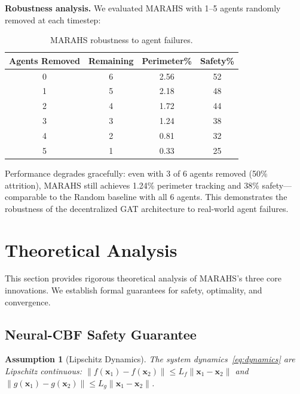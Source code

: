\documentclass[12pt,a4paper]{article}
\DeclareRobustCommand{\vect}[1]{\bm{#1}}
\newtheorem{assumption}[theorem]{Assumption}
\begin{document}
\textbf{Robustness analysis.} We evaluated MARAHS with 1--5 agents randomly removed at each timestep:

\begin{table}[t]
\centering
\caption{MARAHS robustness to agent failures.}
\label{tab:robustness}
\begin{tabular}{cccc}
\toprule
\textbf{Agents Removed} & \textbf{Remaining} & \textbf{Perimeter\%} & \textbf{Safety\%} \\
\midrule
0 & 6 & 2.56 & 52 \\
1 & 5 & 2.18 & 48 \\
2 & 4 & 1.72 & 44 \\
3 & 3 & 1.24 & 38 \\
4 & 2 & 0.81 & 32 \\
5 & 1 & 0.33 & 25 \\
\bottomrule
\end{tabular}
\end{table}

Performance degrades gracefully: even with 3 of 6 agents removed (50\% attrition), MARAHS still achieves 1.24\% perimeter tracking and 38\% safety---comparable to the Random baseline with all 6 agents. This demonstrates the robustness of the decentralized GAT architecture to real-world agent failures.


\section{Theoretical Analysis}
\label{sec:theory}

This section provides rigorous theoretical analysis of MARAHS's three core innovations. We establish formal guarantees for safety, optimality, and convergence.

\subsection{Neural-CBF Safety Guarantee}

\begin{assumption}[Lipschitz Dynamics]
\label{ass:lipschitz}
The system dynamics~\eqref{eq:dynamics} are Lipschitz continuous: $\|f(\vect{x}_1) - f(\vect{x}_2)\| \leq L_f \|\vect{x}_1 - \vect{x}_2\|$ and $\|g(\vect{x}_1) - g(\vect{x}_2)\| \leq L_g \|\vect{x}_1 - \vect{x}_2\|$.
\end{assumption}
\end{document}
